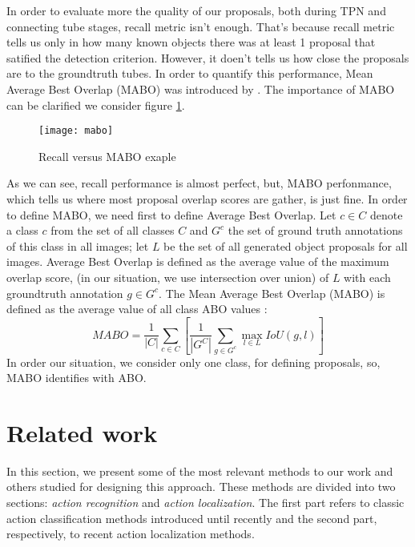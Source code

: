 In order to evaluate more the quality of our proposals, both during TPN and connecting tube stages, recall metric isn't enough.
That's because recall metric tells us only in how many known objects there was at least 1 proposal that satified the detection
criterion. However, it doen't tells us how close the proposals are to the groundtruth tubes. In order to quantify this performance,
Mean Average Best Overlap (MABO) was introduced by \cite{DBLP:journals/corr/WinschelLE16}. The importance of MABO can be clarified 
we consider figure \ref{fig:mabo_fig}.

\begin{figure}[h]
  \centering
  \texttt{[image: mabo]}
  \caption{Recall versus MABO exaple}
  \label{fig:mabo_fig}
\end{figure}

As we can see, recall performance is almost perfect, but, MABO perfonmance, which tells us where most proposal overlap scores are gather,
is just fine. In order to define MABO, we need first to define Average Best Overlap. Let $ c \in C$ denote a class $c$ from the set of all
classes $C$ and $G^c$ the set of ground truth annotations of this class in all images; let $L$ be the set of all generated object proposals
for all images. Average Best Overlap is defined as the average value of the maximum overlap score, (in our situation, we use intersection
over union) of $L$ with each groundtruth annotation $g \in G^c$. The Mean Average Best Overlap (MABO) is defined as the average value of all
class ABO values :
\[ MABO = \frac{1}{|C|} \sum_{c \in C} [ \frac {1}{|G^C|} \sum_{g \in G^c} \max_{l \in L} IoU(g,l)]  \]
In order our situation, we consider only one class, for defining proposals, so, MABO identifies with ABO.

\section{Related work}
In this section, we present some of the most relevant methods to our work and others studied for designing this approach. These methods
 are divided into two sections: \textit{action recognition} and \textit{action localization}. The first part refers to classic action classification methods introduced until recently and the second part, respectively, to recent action localization methods. 
